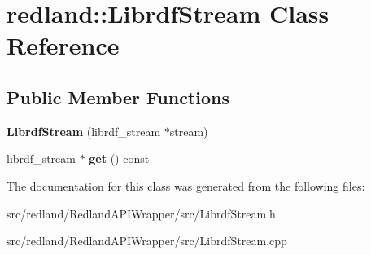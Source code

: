 \hypertarget{classredland_1_1LibrdfStream}{}\section{redland\+:\+:Librdf\+Stream Class Reference}
\label{classredland_1_1LibrdfStream}
\subsection*{Public Member Functions}
\begin{DoxyCompactItemize}
\item 
\mbox{\label{classredland_1_1LibrdfStream_aaa64a7ef8a26be8cf35f3b31d6e34a1b}} 
{\bfseries Librdf\+Stream} (librdf\+\_\+stream $\ast$stream)
\item 
\mbox{\label{classredland_1_1LibrdfStream_a5b52659abdfc01e583e1b9941eec2c4b}} 
librdf\+\_\+stream $\ast$ {\bfseries get} () const
\end{DoxyCompactItemize}


The documentation for this class was generated from the following files\+:\begin{DoxyCompactItemize}
\item 
src/redland/\+Redland\+A\+P\+I\+Wrapper/src/Librdf\+Stream.\+h\item 
src/redland/\+Redland\+A\+P\+I\+Wrapper/src/Librdf\+Stream.\+cpp\end{DoxyCompactItemize}
